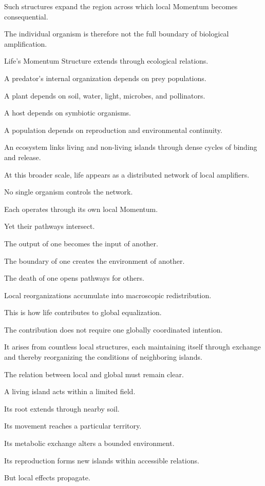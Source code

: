 Such structures expand the region across which local Momentum becomes consequential.

The individual organism is therefore not the full boundary of biological amplification.

Life’s Momentum Structure extends through ecological relations.

A predator’s internal organization depends on prey populations.

A plant depends on soil, water, light, microbes, and pollinators.

A host depends on symbiotic organisms.

A population depends on reproduction and environmental continuity.

An ecosystem links living and non-living islands through dense cycles of binding and release.

At this broader scale, life appears as a distributed network of local amplifiers.

No single organism controls the network.

Each operates through its own local Momentum.

Yet their pathways intersect.

The output of one becomes the input of another.

The boundary of one creates the environment of another.

The death of one opens pathways for others.

Local reorganizations accumulate into macroscopic redistribution.

This is how life contributes to global equalization.

The contribution does not require one globally coordinated intention.

It arises from countless local structures, each maintaining itself through exchange and thereby reorganizing the conditions of neighboring islands.

The relation between local and global must remain clear.

A living island acts within a limited field.

Its root extends through nearby soil.

Its movement reaches a particular territory.

Its metabolic exchange alters a bounded environment.

Its reproduction forms new islands within accessible relations.

But local effects propagate.

